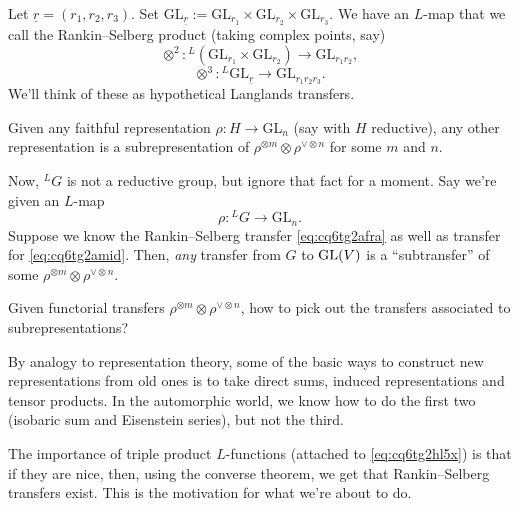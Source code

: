 \documentclass[reqno]{amsart} 
\numberwithin{theorem}{section}
\numberwithin{equation}{section}
\numberwithin{exercise}{section}
\begin{document}
Let $\underline{r} =(r_1, r_2, r_3)$.  Set $\mathrm{GL}_{\underline{r}} :=\mathrm{GL}_{r_1} \times\mathrm{GL}_{r_2} \times\mathrm{GL}_{r_3}$.  We have an $L$-map that we call the Rankin--Selberg product (taking complex points, say)
\begin{equation}\label{eq:cq6tg2afra}
  \otimes^2 : {}^L(\mathrm{GL}_{r_1} \times\mathrm{GL}_{r_2}) \rightarrow\mathrm{GL}_{r_1 r_2},
\end{equation}
\begin{equation}\label{eq:cq6tg2hl5x}
  \otimes^3 : {}^L\mathrm{GL}_{\underline{r}} \rightarrow\mathrm{GL}_{r_1 r_2 r_3}.
\end{equation}
We'll think of these as hypothetical Langlands transfers.
\begin{theorem}[Chevalley]\label{theorem:cq6tho7t2z}
  Given any faithful representation $\rho : H \rightarrow \mathrm{GL}_n$ (say with $H$ reductive), any other representation is a subrepresentation of $\rho^{\otimes m} \otimes \rho^{\vee \otimes n}$ for some $m$ and $n$.
\end{theorem}
Now, ${}^L G$ is not a reductive group, but ignore that fact for a moment.  Say we're given an $L$-map
\begin{equation}\label{eq:cq6tg2amid}
  \rho :{}^L G \rightarrow \mathrm{GL}_n.
\end{equation}
Suppose we know the Rankin--Selberg transfer \eqref{eq:cq6tg2afra} as well as transfer for \eqref{eq:cq6tg2amid}.  Then, \emph{any} transfer from $G$ to $\operatorname{GL}(V)$ is a ``subtransfer'' of some $\rho^{\otimes m} \otimes \rho^{\vee \otimes n}$.

\begin{question}\label{question:cq6tho7sd5}
  Given functorial transfers $\rho^{\otimes m} \otimes \rho^{\vee \otimes n}$, how to pick out the transfers associated to subrepresentations?
\end{question}

By analogy to representation theory, some of the basic ways to construct new representations from old ones is to take direct sums, induced representations and tensor products.  In the automorphic world, we know how to do the first two (isobaric sum and Eisenstein series), but not the third.

The importance of triple product $L$-functions (attached to \eqref{eq:cq6tg2hl5x}) is that if they are nice, then, using the converse theorem, we get that Rankin--Selberg transfers exist.  This is the motivation for what we're about to do.
\end{document}
